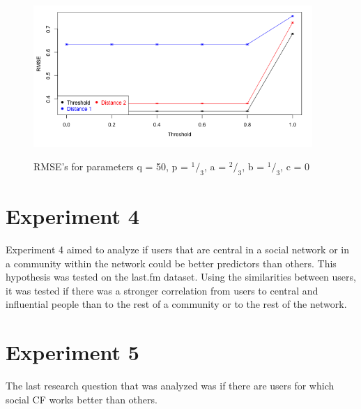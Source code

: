 \begin{figure}[!ht]
\includegraphics[width=400px]{./4-experiments/figures/Result2_50_066_033_033.png}
\label{f:result01}
\caption{RMSE's for parameters q = 50, p = $^1 / _3$, a = $^2 / _3$, b = $^1 / _3$, c = 0}
\end{figure}
\section{Experiment 4}
\label{st:experiment4} Experiment 4 aimed to analyze if users that are central in a social network or in a community within the network could be better predictors than others. This hypothesis was tested on the last.fm dataset. Using the similarities between users, it was tested if there was a stronger correlation from users to central and influential people than to the rest of a community or to the rest of the network. 
\section{Experiment 5}
\label{st:experiment5} The last research question that was analyzed was if there are users for which social CF works better than others. 